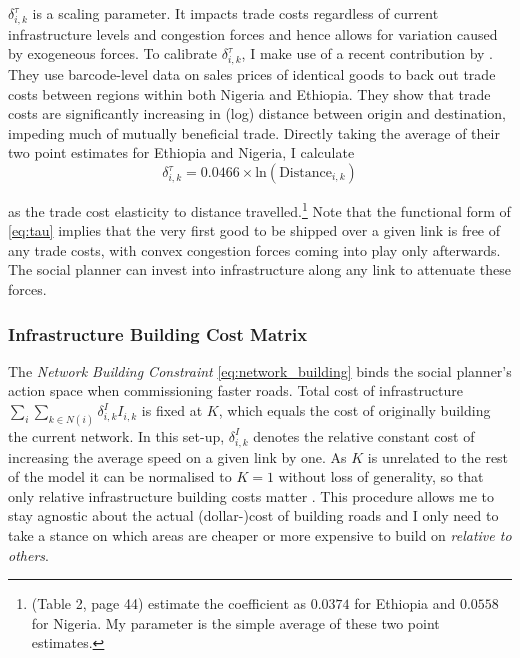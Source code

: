 \documentclass[11pt, oneside]{article}   	%
\begin{document}
$\delta^{\tau}_{i, k}$ is a scaling parameter. It impacts trade costs regardless of current infrastructure levels and congestion forces and hence allows for variation caused by exogeneous forces. To calibrate $\delta^{\tau}_{i, k}$, I make use of a recent contribution by \cite{Atkin_WhoGettingGlobalized_2015}. They use barcode-level data on sales prices of identical goods to back out trade costs between regions within both Nigeria and Ethiopia. They show that trade costs are significantly increasing in (log) distance between origin and destination, impeding much of mutually beneficial trade. Directly taking the average of their two point estimates for Ethiopia and Nigeria, I calculate
\begin{equation}
  \delta^{\tau}_{i,k} =  0.0466\times\textrm{ln}(\textrm{Distance}_{i,k})
  \label{eq:delta_tau}
\end{equation}

as the trade cost elasticity to distance travelled.\footnote{\citeauthor{Atkin_WhoGettingGlobalized_2015} (Table 2, page 44) estimate the coefficient as $0.0374$ for Ethiopia and $0.0558$ for Nigeria. My parameter is the simple average of these two point estimates.} Note that the functional form of \eqref{eq:tau} implies that the very first good to be shipped over a given link is free of any trade costs, with convex congestion forces coming into play only  afterwards. The social planner can invest into infrastructure along any link to attenuate these forces.

\subsubsection{Infrastructure Building Cost Matrix }
The \emph{Network Building Constraint} \eqref{eq:network_building} binds the social planner's action space when commissioning faster roads. Total cost of infrastructure $\sum_{i}^{}\sum_{k \in N(i)}^{} \delta_{i,k}^{I}I_{i,k}$ is fixed at $K$, which equals the cost of originally building the current network. In this set-up, $\delta_{i,k}^{I}$ denotes the relative constant cost of increasing the average speed on a given link by one. As $K$ is unrelated to the rest of the model it can be normalised to $K=1$ without loss of generality, so that only relative infrastructure building costs matter \citep{Fajgelbaum_OptimalTransportNetworks_2017}. This procedure allows me to stay agnostic about the actual (dollar-)cost of building roads and I only need to take a stance on which areas are cheaper or more expensive to build on \emph{relative to others}.
\end{document}
